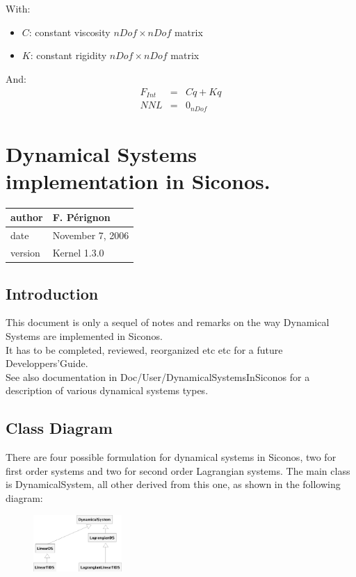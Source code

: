 \documentclass[10pt]{report}
\begin{document}
With:
\begin{itemize}
\item $C$: constant viscosity $nDof\times nDof$ matrix 
\item $K$: constant rigidity $nDof\times nDof$ matrix 
\end{itemize}

And: 
\begin{eqnarray}
F_{Int} &=& C \dot q + K q \\
NNL &=& 0_{nDof} 
\end{eqnarray}



\chapter{Dynamical Systems implementation in Siconos.}

\begin{table}[!ht]
  \begin{tabular}{|l|l|}
    \hline
    author  & F.  P\'erignon \\
    \hline
    date    & November 7, 2006 \\ 
    \hline
    version & Kernel 1.3.0 \\
    \hline
  \end{tabular}
\end{table}




\section{Introduction}
This document is only a sequel of notes and remarks on the way Dynamical Systems are implemented in Siconos.\\
It has to be completed, reviewed, reorganized etc etc for a future Developpers'Guide. \\
See also documentation in Doc/User/DynamicalSystemsInSiconos for a description of various dynamical systems types.

\section{Class Diagram}
There are four possible formulation for dynamical systems in Siconos,
two for first order systems and two for second order Lagrangian systems. The main class is DynamicalSystem, all other derived from this one, as shown in the following diagram:
\begin{figure}[htbp]
  \centering
 \includegraphics[width=0.3\textwidth]{./DSClassDiagram.eps}
  \label{DSDiagram}
\end{figure}
\end{document}
